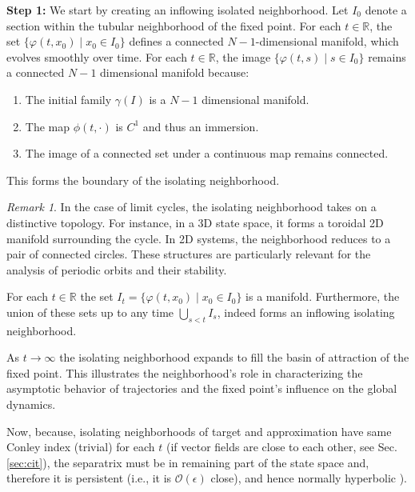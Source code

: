 \documentclass{article}
\theoremstyle{definition}
\theoremstyle{remark}
\newtheorem{remark}{Remark}
\newcommand{\reals}{\mathbb{R}}
\newcounter{ct}
\begin{document}
\textbf{Step 1:} 
We start by creating an inflowing isolated neighborhood.
 Let $I_0$ denote a section within the tubular neighborhood of the fixed point.
For each $t\in\reals$, the set $\{\varphi(t,x_0) \mid x_0\in I_0\}$ defines a connected $N-1$-dimensional manifold, which evolves smoothly over time. 
For each \( t \in \reals \), the image \( \{ \varphi(t, s) \mid s \in I_0 \} \) remains a connected $N-1$ dimensional manifold because:
\begin{enumerate}
    \item The initial family \( \gamma(I) \) is a $N-1$ dimensional manifold.
    \item The map \( \phi(t, \cdot) \) is \( C^1 \) and thus an immersion.
    \item The image of a connected set under a continuous map remains connected.
\end{enumerate}
This forms the boundary of the isolating neighborhood.

\begin{remark}
In the case of limit cycles, the isolating neighborhood takes on a distinctive topology. For instance, in a 3D state space, it forms a toroidal 2D manifold surrounding the cycle. In 2D systems, the neighborhood reduces to a pair of connected circles. These structures are particularly relevant for the analysis of periodic orbits and their stability.
 \end{remark}

For each $t\in\reals$ the set $I_t = \{\varphi(t,x_0) \mid x_0 \in I_0 \}$ is a manifold.
Furthermore, the union of these sets up to any time  $\bigcup_{s<t}I_s$, indeed forms an inflowing isolating neighborhood.

 As $t\rightarrow\infty$ the isolating neighborhood expands to fill the basin of attraction of the fixed point.
 This illustrates the neighborhood’s role in characterizing the asymptotic behavior of trajectories and the fixed point’s influence on the global dynamics.

 Now, because, isolating neighborhoods of target and approximation have same Conley index (trivial) for each $t$ (if vector fields are close to each other, see Sec.\ref{sec:cit}),
the separatrix must be in remaining part of the state space and, therefore it is persistent (i.e., it is $\mathcal{O}(\epsilon)$ close), and hence normally hyperbolic \citep{mane1978persistent}).
\end{document}

